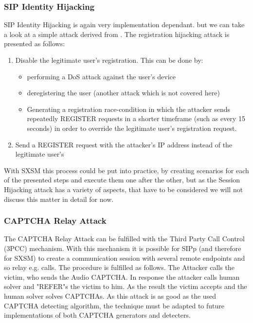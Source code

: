 \documentclass[final
	]{issa}
\begin{document}
\subsubsection{SIP Identity Hijacking}
SIP Identity Hijacking is again very implementation dependant. but we can take a look at a simple attack derived from \cite{homepage:attack}. The registration hijacking attack is presented as follows:
\begin{enumerate}
\item Disable the legitimate user's registration. This can be done by:
\begin{itemize}
\item performing a DoS attack against the user's device
\item deregistering the user (another attack which is not covered here)
\item Generating a registration race-condition in which the attacker sends repeatedly REGISTER requests in a shorter timeframe (such as every 15 seconds) in order to override the legitimate user's registration request. 
\end{itemize}
\item Send a REGISTER request with the attacker's IP address instead of the legitimate user's
\end{enumerate}
With SXSM this process could be put into practice, by creating scenarios for each of the presented steps and execute them one after the other, but as the Session Hijacking attack has a variety of aspects, that have to be considered we will not discuss this matter in detail for now.
\subsubsection{CAPTCHA Relay Attack}
The CAPTCHA Relay Attack can be fulfilled with the Third Party Call Control (3PCC) mechanism. With this mechanism it is possible for SIPp (and therefore for SXSM) to create a communication session with several remote endpoints and so relay e.g. calls. The procedure is fulfilled as follows. The Attacker calls the victim, who sends the Audio CAPTCHA. In response the
attacker calls human solver and "REFER"s the victim to him. As the result the victim 
accepts and the human solver solves CAPTCHAs.
As this attack is as good as the used CAPTCHA detecting algorithm, the technique must be adapted to future implementations of both CAPTCHA generators and detecters.
\end{document}
